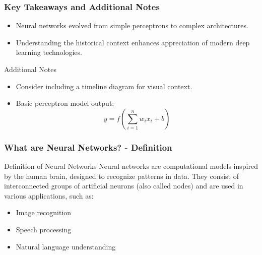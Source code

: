 \documentclass[aspectratio=169]{beamer}
\begin{document}
\begin{frame}[fragile]
    \frametitle{Key Takeaways and Additional Notes}
    \begin{itemize}
        \item Neural networks evolved from simple perceptrons to complex architectures.
        \item Understanding the historical context enhances appreciation of modern deep learning technologies.
    \end{itemize}
    
    \begin{block}{Additional Notes}
        \begin{itemize}
            \item Consider including a timeline diagram for visual context.
            \item Basic perceptron model output:
            \begin{equation}
            y = f\left(\sum_{i=1}^{n} w_i x_i + b\right)
            \end{equation}
        \end{itemize}
    \end{block}
\end{frame}

\begin{frame}[fragile]
    \frametitle{What are Neural Networks? - Definition}
    \begin{block}{Definition of Neural Networks}
        Neural networks are computational models inspired by the human brain, designed to recognize patterns in data. 
        They consist of interconnected groups of artificial neurons (also called nodes) and are used in various applications, such as:
        \begin{itemize}
            \item Image recognition
            \item Speech processing
            \item Natural language understanding
        \end{itemize}
    \end{block}
\end{frame}
\end{document}
